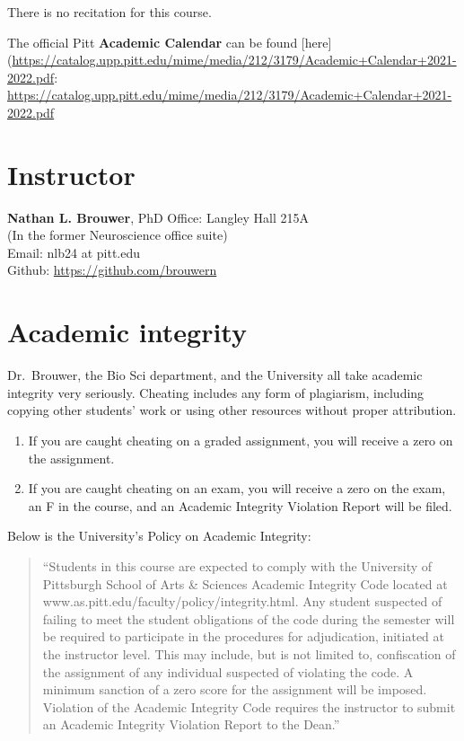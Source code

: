 \documentclass[
]{book}
\providecommand{\tightlist}{%
  \setlength{\itemsep}{0pt}\setlength{\parskip}{0pt}}
\begin{document}
There is no recitation for this course.

The official Pitt \textbf{Academic Calendar} can be found {[}here{]}(\url{https://catalog.upp.pitt.edu/mime/media/212/3179/Academic+Calendar+2021-2022.pdf}: \url{https://catalog.upp.pitt.edu/mime/media/212/3179/Academic+Calendar+2021-2022.pdf}

\hypertarget{nlb}{%
\chapter{Instructor}\label{nlb}}

\textbf{Nathan L. Brouwer}, PhD
Office: Langley Hall 215A\\
(In the former Neuroscience office suite)\\
Email: nlb24 at pitt.edu\\
Github: \url{https://github.com/brouwern}

\hypertarget{academic-integrity}{%
\chapter{Academic integrity}\label{academic-integrity}}

Dr.~Brouwer, the Bio Sci department, and the University all take academic integrity very seriously. Cheating includes any form of plagiarism, including copying other students' work or using other resources without proper attribution.

\begin{enumerate}
\def\labelenumi{\arabic{enumi}.}
\tightlist
\item
  If you are caught cheating on a graded assignment, you will receive a zero on the assignment.
\item
  If you are caught cheating on an exam, you will receive a zero on the exam, an F in the course, and an Academic Integrity Violation Report will be filed.
\end{enumerate}

Below is the University's Policy on Academic Integrity:

\begin{quote}
``Students in this course are expected to comply with the University of Pittsburgh School of Arts \& Sciences Academic Integrity Code located at www.as.pitt.edu/faculty/policy/integrity.html. Any student suspected of failing to meet the student obligations of the code during the semester will be required to participate in the procedures for adjudication, initiated at the instructor level. This may include, but is not limited to, confiscation of the assignment of any individual suspected of violating the code. A minimum sanction of a zero score for the assignment will be imposed. Violation of the Academic Integrity Code requires the instructor to submit an Academic Integrity Violation Report to the Dean.''
\end{quote}
\end{document}
